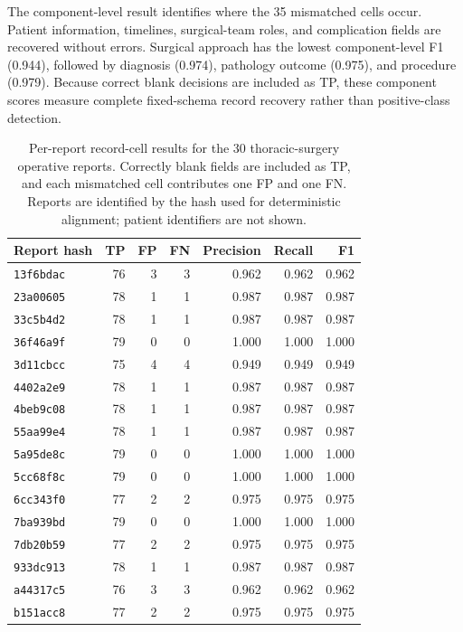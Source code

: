 The component-level result identifies where the 35 mismatched cells occur. Patient information, timelines, surgical-team roles, and complication fields are recovered without errors. Surgical approach has the lowest component-level F1 (0.944), followed by diagnosis (0.974), pathology outcome (0.975), and procedure (0.979). Because correct blank decisions are included as TP, these component scores measure complete fixed-schema record recovery rather than positive-class detection.

\begin{table}[t]
\centering
\caption{Per-report record-cell results for the 30 thoracic-surgery operative reports. Correctly blank fields are included as TP, and each mismatched cell contributes one FP and one FN. Reports are identified by the hash used for deterministic alignment; patient identifiers are not shown.}
\label{tab:medical_per_case}
\normalsize
\setlength{\tabcolsep}{5pt}
\begin{tabular}{lrrrrrr}
\hline
Report hash & TP & FP & FN & Precision & Recall & F1 \\
\hline
\texttt{13f6bdac} & 76 & 3 & 3 & 0.962 & 0.962 & 0.962 \\
\texttt{23a00605} & 78 & 1 & 1 & 0.987 & 0.987 & 0.987 \\
\texttt{33c5b4d2} & 78 & 1 & 1 & 0.987 & 0.987 & 0.987 \\
\texttt{36f46a9f} & 79 & 0 & 0 & 1.000 & 1.000 & 1.000 \\
\texttt{3d11cbcc} & 75 & 4 & 4 & 0.949 & 0.949 & 0.949 \\
\texttt{4402a2e9} & 78 & 1 & 1 & 0.987 & 0.987 & 0.987 \\
\texttt{4beb9c08} & 78 & 1 & 1 & 0.987 & 0.987 & 0.987 \\
\texttt{55aa99e4} & 78 & 1 & 1 & 0.987 & 0.987 & 0.987 \\
\texttt{5a95de8c} & 79 & 0 & 0 & 1.000 & 1.000 & 1.000 \\
\texttt{5cc68f8c} & 79 & 0 & 0 & 1.000 & 1.000 & 1.000 \\
\texttt{6cc343f0} & 77 & 2 & 2 & 0.975 & 0.975 & 0.975 \\
\texttt{7ba939bd} & 79 & 0 & 0 & 1.000 & 1.000 & 1.000 \\
\texttt{7db20b59} & 77 & 2 & 2 & 0.975 & 0.975 & 0.975 \\
\texttt{933dc913} & 78 & 1 & 1 & 0.987 & 0.987 & 0.987 \\
\texttt{a44317c5} & 76 & 3 & 3 & 0.962 & 0.962 & 0.962 \\
\texttt{b151acc8} & 77 & 2 & 2 & 0.975 & 0.975 & 0.975 \\

\end{tabular}
\end{table}
